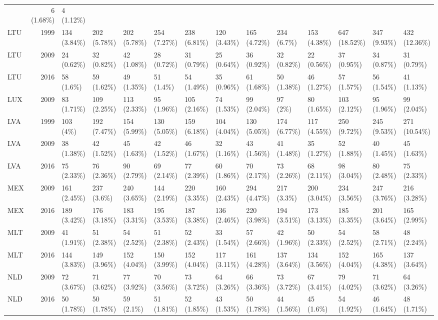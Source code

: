 \documentclass[]{article}
\begin{document}
\begin{longtable}[]{@{}lrllllllllllll@{}}
& 6 (1.68\%) & 4 (1.12\%)\tabularnewline
LTU & 1999 & 134 (3.84\%) & 202 (5.78\%) & 202 (5.78\%) & 254 (7.27\%) &
238 (6.81\%) & 120 (3.43\%) & 165 (4.72\%) & 234 (6.7\%) & 153 (4.38\%)
& 647 (18.52\%) & 347 (9.93\%) & 432 (12.36\%)\tabularnewline
LTU & 2009 & 24 (0.62\%) & 32 (0.82\%) & 42 (1.08\%) & 28 (0.72\%) & 31
(0.79\%) & 25 (0.64\%) & 36 (0.92\%) & 32 (0.82\%) & 22 (0.56\%) & 37
(0.95\%) & 34 (0.87\%) & 31 (0.79\%)\tabularnewline
LTU & 2016 & 58 (1.6\%) & 59 (1.62\%) & 49 (1.35\%) & 51 (1.4\%) & 54
(1.49\%) & 35 (0.96\%) & 61 (1.68\%) & 50 (1.38\%) & 46 (1.27\%) & 57
(1.57\%) & 56 (1.54\%) & 41 (1.13\%)\tabularnewline
LUX & 2009 & 83 (1.71\%) & 109 (2.25\%) & 113 (2.33\%) & 95 (1.96\%) &
105 (2.16\%) & 74 (1.53\%) & 99 (2.04\%) & 97 (2\%) & 80 (1.65\%) & 103
(2.12\%) & 95 (1.96\%) & 99 (2.04\%)\tabularnewline
LVA & 1999 & 103 (4\%) & 192 (7.47\%) & 154 (5.99\%) & 130 (5.05\%) &
159 (6.18\%) & 104 (4.04\%) & 130 (5.05\%) & 174 (6.77\%) & 117 (4.55\%)
& 250 (9.72\%) & 245 (9.53\%) & 271 (10.54\%)\tabularnewline
LVA & 2009 & 38 (1.38\%) & 42 (1.52\%) & 45 (1.63\%) & 42 (1.52\%) & 46
(1.67\%) & 32 (1.16\%) & 43 (1.56\%) & 41 (1.48\%) & 35 (1.27\%) & 52
(1.88\%) & 40 (1.45\%) & 45 (1.63\%)\tabularnewline
LVA & 2016 & 75 (2.33\%) & 76 (2.36\%) & 90 (2.79\%) & 69 (2.14\%) & 77
(2.39\%) & 60 (1.86\%) & 70 (2.17\%) & 73 (2.26\%) & 68 (2.11\%) & 98
(3.04\%) & 80 (2.48\%) & 75 (2.33\%)\tabularnewline
MEX & 2009 & 161 (2.45\%) & 237 (3.6\%) & 240 (3.65\%) & 144 (2.19\%) &
220 (3.35\%) & 160 (2.43\%) & 294 (4.47\%) & 217 (3.3\%) & 200 (3.04\%)
& 234 (3.56\%) & 247 (3.76\%) & 216 (3.28\%)\tabularnewline
MEX & 2016 & 189 (3.42\%) & 176 (3.18\%) & 183 (3.31\%) & 195 (3.53\%) &
187 (3.38\%) & 136 (2.46\%) & 220 (3.98\%) & 194 (3.51\%) & 173 (3.13\%)
& 185 (3.35\%) & 201 (3.64\%) & 165 (2.99\%)\tabularnewline
MLT & 2009 & 41 (1.91\%) & 51 (2.38\%) & 54 (2.52\%) & 51 (2.38\%) & 52
(2.43\%) & 33 (1.54\%) & 57 (2.66\%) & 42 (1.96\%) & 50 (2.33\%) & 54
(2.52\%) & 58 (2.71\%) & 48 (2.24\%)\tabularnewline
MLT & 2016 & 144 (3.83\%) & 149 (3.96\%) & 152 (4.04\%) & 150 (3.99\%) &
152 (4.04\%) & 117 (3.11\%) & 161 (4.28\%) & 137 (3.64\%) & 134 (3.56\%)
& 152 (4.04\%) & 165 (4.38\%) & 137 (3.64\%)\tabularnewline
NLD & 2009 & 72 (3.67\%) & 71 (3.62\%) & 77 (3.92\%) & 70 (3.56\%) & 73
(3.72\%) & 64 (3.26\%) & 66 (3.36\%) & 73 (3.72\%) & 67 (3.41\%) & 79
(4.02\%) & 71 (3.62\%) & 64 (3.26\%)\tabularnewline
NLD & 2016 & 50 (1.78\%) & 50 (1.78\%) & 59 (2.1\%) & 51 (1.81\%) & 52
(1.85\%) & 43 (1.53\%) & 50 (1.78\%) & 44 (1.56\%) & 45 (1.6\%) & 54
(1.92\%) & 46 (1.64\%) & 48 (1.71\%)\tabularnewline

\end{longtable}
\end{document}
